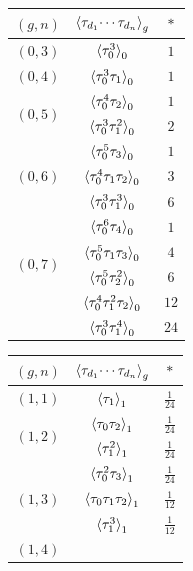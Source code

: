 \documentclass[11pt,reqno]{amsart}
\numberwithin{equation}{section}
\theoremstyle{plain}
\theoremstyle{definition}
\begin{document}
\begin{table}
  \centering
  {\small
  \renewcommand{\arraystretch}{1.3}
  \hfill
  \begin{tabular}[t]{c|c|c}
    \toprule
    $(g,n)$ & $\braket{\tau_{d_1} \!\cdots \tau_{d_n}}_g$ & $\ast$ \\
    \midrule
    $(0,3)$ & $\braket{\tau_0^3}_0$ & $1$ \\
    \midrule
    $(0,4)$ & $\braket{\tau_0^3 \tau_1}_0$ & $1$ \\
    \midrule
    \multirow{2}{*}{$(0,5)$}
    & $\braket{\tau_0^4 \tau_2}_0$ & $1$ \\
    & $\braket{\tau_0^3 \tau_1^2}_0$ & $2$ \\
    \midrule
    \multirow{3}{*}{$(0,6)$}
    & $\braket{\tau_0^5 \tau_3}_0$ & $1$ \\
    & $\braket{\tau_0^4 \tau_1 \tau_2}_0$ & $3$ \\
    & $\braket{\tau_0^3 \tau_1^3}_0$ & $6$ \\
    \midrule
    \multirow{4}{*}{$(0,7)$}
    & $\braket{\tau_0^6 \tau_4}_0$ & $1$ \\
    & $\braket{\tau_0^5 \tau_1 \tau_3}_0$ & $4$ \\
    & $\braket{\tau_0^5 \tau_2^2}_0$ & $6$ \\
    & $\braket{\tau_0^4 \tau_1^2 \tau_2}_0$ & $12$ \\
    & $\braket{\tau_0^3 \tau_1^4}_0$ & $24$ \\
    \bottomrule
  \end{tabular}
  \hfill
  \begin{tabular}[t]{c|c|c}
    \toprule
    $(g,n)$ & $\braket{\tau_{d_1} \!\cdots \tau_{d_n}}_g$ & $\ast$ \\
    \midrule
    $(1,1)$ & $\braket{\tau_1}_1$ & $\tfrac{1}{24}$ \\
    \midrule
    \multirow{2}{*}{$(1,2)$}
    & $\braket{\tau_0 \tau_2}_1$ & $\tfrac{1}{24}$ \\
    & $\braket{\tau_1^2}_1$ & $\tfrac{1}{24}$ \\
    \midrule
    \multirow{3}{*}{$(1,3)$}
    & $\braket{\tau_0^2 \tau_3}_1$ & $\tfrac{1}{24}$ \\
    & $\braket{\tau_0 \tau_1 \tau_2}_1$ & $\tfrac{1}{12}$ \\
    & $\braket{\tau_1^3}_1$ & $\tfrac{1}{12}$ \\
    \midrule
    \multirow{4}{*}{$(1,4)$}

\end{tabular}}
\end{table}
\end{document}
